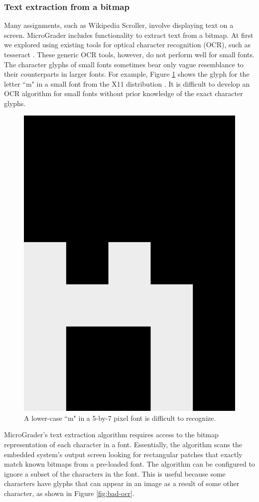 \documentclass[12pt]{article}
\begin{document}
\subsubsection{Text extraction from a bitmap}
Many assignments, such as Wikipedia Scroller, involve displaying text on a screen.  MicroGrader includes functionality to extract text from a bitmap.  At first we explored using existing tools for optical character recognition (OCR), such as tesseract \cite{tesseract}.  These generic OCR tools, however, do not perform well for small fonts.  The character glyphs of small fonts sometimes bear only vague resemblance to their counterparts in larger fonts.  For example, Figure \ref{fig:small-glyph} shows the glyph for the letter ``m" in a small font from the X11 distribution \cite{5x7}.  It is difficult to develop an OCR algorithm for small fonts without prior knowledge of the exact character glyphs.


\begin{figure}
\centering
\includegraphics[width=0.3\linewidth]{glyph-m.png}
\caption{A lower-case ``m" in a 5-by-7 pixel font is difficult to recognize.}
\label{fig:small-glyph}
\end{figure}

MicroGrader's text extraction algorithm requires access to the bitmap representation of each character in a font.  Essentially, the algorithm scans the embedded system's output screen looking for rectangular patches that exactly match known bitmaps from a pre-loaded font.  The algorithm can be configured to ignore a subset of the characters in the font.  This is useful because some characters have glyphs that can appear in an image as a result of some other character, as shown in Figure \ref{fig:bad-ocr}.
\end{document}

